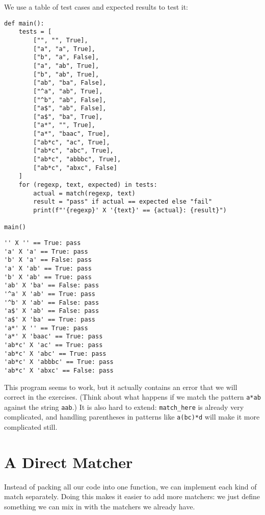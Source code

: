 \documentclass{scrbook}
\begin{document}
We use a table of test cases and expected results to test it:


\begin{lstlisting}[frame=single,frameround=tttt]
def main():
    tests = [
        ["", "", True],
        ["a", "a", True],
        ["b", "a", False],
        ["a", "ab", True],
        ["b", "ab", True],
        ["ab", "ba", False],
        ["^a", "ab", True],
        ["^b", "ab", False],
        ["a$", "ab", False],
        ["a$", "ba", True],
        ["a*", "", True],
        ["a*", "baac", True],
        ["ab*c", "ac", True],
        ["ab*c", "abc", True],
        ["ab*c", "abbbc", True],
        ["ab*c", "abxc", False]
    ]
    for (regexp, text, expected) in tests:
        actual = match(regexp, text)
        result = "pass" if actual == expected else "fail"
        print(f"'{regexp}' X '{text}' == {actual}: {result}")

main()
\end{lstlisting}



\begin{lstlisting}[frame=single,frameround=tttt]
'' X '' == True: pass
'a' X 'a' == True: pass
'b' X 'a' == False: pass
'a' X 'ab' == True: pass
'b' X 'ab' == True: pass
'ab' X 'ba' == False: pass
'^a' X 'ab' == True: pass
'^b' X 'ab' == False: pass
'a$' X 'ab' == False: pass
'a$' X 'ba' == True: pass
'a*' X '' == True: pass
'a*' X 'baac' == True: pass
'ab*c' X 'ac' == True: pass
'ab*c' X 'abc' == True: pass
'ab*c' X 'abbbc' == True: pass
'ab*c' X 'abxc' == False: pass
\end{lstlisting}



This program seems to work,
but it actually contains an error that we will correct in the exercises.
(Think about what happens if we match the pattern \texttt{a*ab} against the string \texttt{{\textquotesingle}aab{\textquotesingle}}.)
It is also hard to extend:
\texttt{match\_here} is already very complicated,
and handling parentheses in patterns like \texttt{a(bc)*d} will make it more complicated still.

\section{A Direct Matcher}\label{matching-direct}


Instead of packing all our code into one function,
we can implement each kind of match separately.
Doing this makes it easier to add more matchers:
we just define something we can mix in with the matchers we already have.
\end{document}
